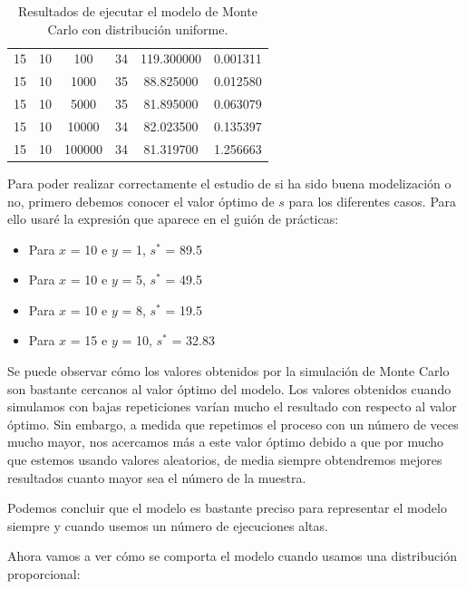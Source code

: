 \documentclass[11pt,a4paper]{report}
\begin{document}
\begin{table}[H]
{\begin{tabular}{|c|c|c|c|c|c|}
        15 & 10 & 100 & 34 & 119.300000 & 0.001311 \\ 
        15 & 10 & 1000 & 35 & 88.825000 & 0.012580 \\ 
        15 & 10 & 5000 & 35 & 81.895000 & 0.063079 \\ 
        15 & 10 & 10000 & 34 & 82.023500 & 0.135397 \\ 
        15 & 10 & 100000 & 34 & 81.319700 & 1.256663 \\ \hline	
\end{tabular}
}%
\caption{Resultados de ejecutar el modelo de Monte Carlo con distribución uniforme.}
\label{tabla1}
\end{table}

Para poder realizar correctamente el estudio de si ha sido buena modelización o no, primero debemos conocer el valor óptimo de $s$ para los diferentes casos. Para ello usaré la expresión que aparece en el guión de prácticas:

\begin{itemize}
	\item{Para $x$ = 10 e $y$ = 1, $s^*$ = 89.5}
	\item{Para $x$ = 10 e $y$ = 5, $s^*$ = 49.5}
	\item{Para $x$ = 10 e $y$ = 8, $s^*$ = 19.5}
	\item{Para $x$ = 15 e $y$ = 10, $s^*$ = 32.83}
\end{itemize}

Se puede observar cómo los valores obtenidos por la simulación de Monte Carlo son bastante cercanos al valor óptimo del modelo. Los valores obtenidos cuando simulamos con bajas repeticiones varían mucho el resultado con respecto al valor óptimo. Sin embargo, a medida que repetimos el proceso con un número de veces mucho mayor, nos acercamos más a este valor óptimo debido a que por mucho que estemos usando valores aleatorios, de media siempre obtendremos mejores resultados cuanto mayor sea el número de la muestra.

Podemos concluir que el modelo es bastante preciso para representar el modelo siempre y cuando usemos un número de ejecuciones altas.

Ahora vamos a ver cómo se comporta el modelo cuando usamos una distribución proporcional:
\end{document}
